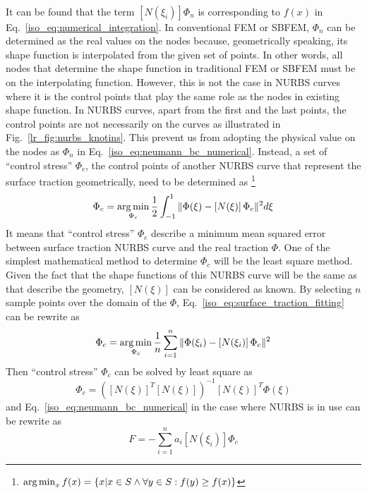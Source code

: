 \paragraph{}
It can be found that the term $[N(\xi_i)] \Phi_n$ is corresponding to $f(x)$ in Eq.~\ref{iso_eq:numerical_integration}.
In conventional FEM or SBFEM, $\Phi_n$ can be determined as the real values on the nodes because, geometrically speaking, its shape function is interpolated from the given set of points.
In other words, all nodes that determine the shape function in traditional FEM or SBFEM must be on the interpolating function.
However, this is not the case in NURBS curves where it is the control points that play the same role as the nodes in existing shape function.
In NURBS curves, apart from the first and the last points, the control points are not necessarily on the curves as illustrated in Fig.~\ref{lr_fig:nurbs_knotins}.
This prevent us from adopting the physical value on the nodes as $\Phi_n$ in Eq.~\ref{iso_eq:neumann_bc_numerical}.
Instead, a set of ``control stress'' $\Phi_c$, the control points of another NURBS curve that represent the surface traction
    geometrically, need to be determined as \footnote{$\operatorname*{arg\,min}_x f(x) = \left\{
        x | x \in S \wedge \forall y \in S : f(y) \geq f(x)
    \right\}$}
    \begin{equation}
        \Phi_c = \operatorname*{arg\,min}_{\Phi_c}
            \frac{1}{2}
            \int_{-1}^1
            \|
                \Phi(\xi)-
                    \left[ N(\xi) \right]
                    \Phi_c
            \|^2
            d\xi            
    \label{iso_eq:surface_traction_fitting}
    \end{equation}
%
It means that ``control stress'' $\Phi_c$ describe a minimum mean squared error between surface traction NURBS curve and the real traction $\Phi$.
One of the simplest mathematical method to determine $\Phi_c$ will be the least square method.
Given the fact that the shape functions of this NURBS curve will be the same as that describe the geometry, $\left[ N(\xi) \right]$ can be considered as known.
By selecting $n$ sample points over the domain of the $\Phi$, Eq.~\ref{iso_eq:surface_traction_fitting} can be rewrite as
    \begin{equation}
        \Phi_c = \operatorname*{arg\,min}_{\Phi_c}
            \frac{1}{n}
            \sum_{i=1}^n
            \|
                \Phi(\xi_i)-
                    \left[ N(\xi_i) \right]
                    \Phi_c
            \|^2
    \label{iso_eq:surface_traction_fitting_discrete}
    \end{equation}
Then ``control stress'' $\Phi_c$ can be solved by least square as
    \begin{equation}
        \Phi_c= \left(
            \left[ N(\xi) \right] ^T
            \left[ N(\xi) \right]
        \right)^{-1}
        \left[ N(\xi) \right]^T
        \Phi(\xi)
    \end{equation}
and Eq.~\ref{iso_eq:neumann_bc_numerical} in the case where NURBS is in use can be rewrite as
    \begin{equation}
        {F}=-\sum_{i=1}^n
        a_i
        [N(\xi_i)]
        \Phi_c
    \label{iso_eq:neumann_bc_numerical_NURBS}
    \end{equation}
\pagebreak